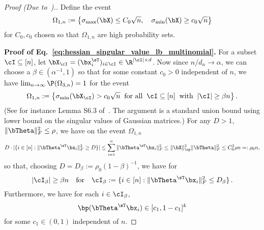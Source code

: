 \begin{proof}[Proof (Due to~\cite{tan2024multinomial}).]

Define the event
\begin{equation}
\Omega_{1,n} := \left\{ \sigma_{\max}(\bX) \le C_0 \sqrt{n},\quad \sigma_{\min}(\bX)\ge c_0\sqrt{n}\right\}
\end{equation}
for $C_0,c_0$ chosen so that $\Omega_{1,n}$ are high probability sets.

\noindent\textbf{Proof of Eq.~\eqref{eq:hessian_singular_value_lb_multinomial}.}
For a subset $\cI\subseteq [n]$, let $\bX_\cI = (\bx_i^\sT)_{i\in\cI} \in\R^{|\cI| \times d}$.
Now since $n/d_n \rightarrow \alpha$, we can choose a $\beta \in(\alpha^{-1},1)$ so that for some constant $c_0>0$ independent of $n$, we have $\lim_{n\to\infty}\P(\Omega_{3,n}) =1$ for the event
\begin{equation}
  \Omega_{1,n} := \left\{\sigma_{\min}(\bX_{\cI}) > c_0\sqrt{n} \;\; \textrm{for all}\;\; \cI \subseteq [n] \;\;\textrm{with}\;\; |\cI| \ge \beta n \right\}.
\end{equation}
(See for instance Lemma S6.3 of~\cite{tan2024multinomial}. The argument is a standard union bound using lower bound on the singular values of Gaussian matrices.)
For any $D  > 1$, $\|\bTheta\|_F^2 \le \rho$, we have on the event $\Omega_{1,n}$
\begin{equation}
   D \cdot|\{i\in[n] : \|\bTheta^\sT\bx_i\|_F^2 \ge D\}| \le  \sum_{i=1}^n \|\bTheta^\sT\bx_i\|_F^2 \le \|\bX\|_\op^2 \|\bTheta\|_F^2 \le C_0^2 \rho n =: \rho_0 n,
\end{equation}
so that, choosing $D =D_\beta := \rho_0 (1-\beta)^{-1}$,  we have for
\begin{equation}
      |\cI_\beta| \ge \beta n  \quad\textrm{for}\quad \cI_\beta := \{i \in[n] : \|\bTheta^\sT\bx_i\|_F^2 \le D_\beta \}\, .
\end{equation}
Furthermore, we have for each $i\in\cI_\beta$,
\begin{equation}
\label{eq:entry_wise_bound_p_hessian}
    \bp(\bTheta^\sT\bx_i) \in  [c_1,1-c_1]^k
\end{equation}
for some $c_1\in(0,1)$ independent of $n$.


\end{proof}
